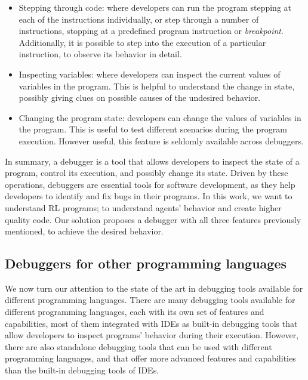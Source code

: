 \begin{itemize}
    \item Stepping through code: where developers can run the program stepping at each of the 
    instructions individually, or step through a number of instructions, stopping at a predefined program 
    instruction or  \emph{breakpoint}. Additionally, it is possible to step into the execution of a particular 
    instruction, to observe its behavior in detail. 
    \item Inspecting variables: where developers can inspect the current values of variables in the 
    program. This is helpful to understand the change in state, possibly giving clues on possible causes 
    of the undesired behavior.
    \item Changing the program state: developers can change the values of variables in the program. 
    This is useful to test different scenarios during the program execution. However useful, this feature 
    is seldomly available across debuggers.
\end{itemize}

In summary, a debugger is a tool that allows developers to inspect the state of a program, control 
its execution, and possibly change its state. Driven by these operations, debuggers are essential 
tools for software development, as they help developers to identify and fix bugs in their programs. 
In this work, we want to understand \ac{RL} programs; to understand agents' behavior and 
create higher quality code. Our solution proposes a debugger with all three features previously
mentioned, to achieve the desired behavior.


\subsection{Debuggers for other programming languages}
\label{sec:other}

We now turn our attention to the state of the art in debugging tools available for different 
programming languages. There are many debugging tools available for different programming 
languages, each with its own set of features and capabilities, most of them integrated with IDEs as
built-in debugging tools that allow developers to inspect programs' behavior during their execution. 
However, there are also standalone debugging tools that can be used with different 
programming languages, and that offer more advanced features and capabilities than the 
built-in debugging tools of IDEs. 

